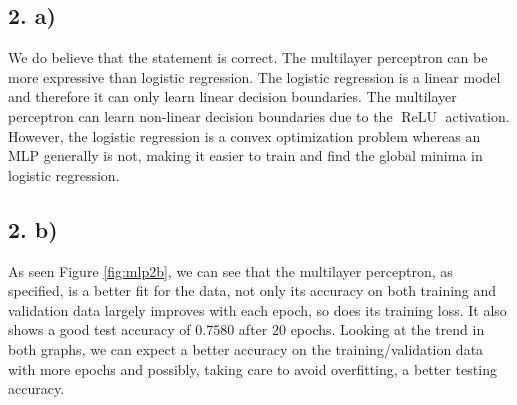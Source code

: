 \documentclass[11pt]{article}
\DeclareMathOperator{\relu}{ReLU}
\begin{document}
\subsection{2. a)}
We do believe that the statement is correct.
The multilayer perceptron can be more expressive than logistic regression.
The logistic regression is a linear model and therefore it can only learn linear decision boundaries.
The multilayer perceptron can learn non-linear decision boundaries due to the $\relu$ activation.
However, the logistic regression is a convex optimization problem whereas an MLP generally is not, making it easier to train and find the global minima in logistic regression.
\subsection{2. b)}
As seen Figure \ref{fig:mlp2b}, we can see that the multilayer perceptron, as specified, is a better fit for the data, not only its accuracy on both training and validation data largely improves with each epoch, so does its training loss. It also shows a good test accuracy of $0.7580$ after $20$ epochs. Looking at the trend in both graphs, we can expect a better accuracy on the training/validation data with more epochs and possibly, taking care to avoid overfitting, a better testing accuracy.
\end{document}
